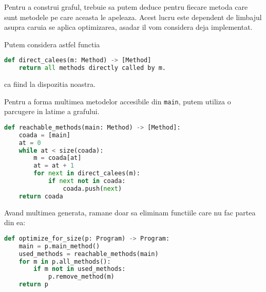 Pentru a construi graful, trebuie sa putem deduce pentru fiecare
metoda care sunt metodele pe care aceasta le apeleaza.
Acest lucru este dependent de limbajul asupra caruia se aplica
optimizarea, asadar il vom considera deja implementat.

Putem considera astfel functia
\begin{lstlisting}[language=Python]
def direct_calees(m: Method) -> [Method]
    return all methods directly called by m.
\end{lstlisting}
ca fiind la dispozitia noastra.

Pentru a forma multimea metodelor accesibile din \texttt{main},
putem utiliza o parcugere in latime a grafului.

\begin{lstlisting}[language=Python]
def reachable_methods(main: Method) -> [Method]:
    coada = [main]
    at = 0
    while at < size(coada):
        m = coada[at]
        at = at + 1
        for next in direct_calees(m):
            if next not in coada:
                coada.push(next)
    return coada
\end{lstlisting}

Avand multimea generata, ramane doar sa eliminam functiile
care nu fac partea din ea:

\begin{lstlisting}[language=Python]
def optimize_for_size(p: Program) -> Program:
    main = p.main_method()
    used_methods = reachable_methods(main)
    for m in p.all_methods():
        if m not in used_methods:
            p.remove_method(m)
    return p
\end{lstlisting}
